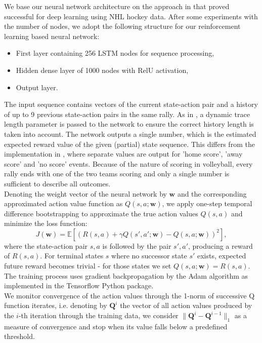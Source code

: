\documentclass{sfuthesis}
\begin{document}
	We base our neural network architecture on the approach in \cite{liu2018deep} that proved successful for deep learning using NHL hockey data. After some experiments with the number of nodes, we adopt the following structure for our reinforcement learning based neural network:
	\begin{itemize}
		\item First layer containing 256 LSTM nodes for sequence processing,
		\item Hidden dense layer of 1000 nodes with RelU activation,
		\item Output layer.
	\end{itemize}
	The input sequence contains vectors of the current state-action pair and a history of up to 9 previous state-action pairs in the same rally. As in \cite{liu2018deep}, a dynamic trace length parameter is passed to the network to ensure the correct history length is taken into account. The network outputs a single number, which is the estimated expected reward value of the given (partial) state sequence. This differs from the implementation in \cite{liu2018deep}, where separate values are output for 'home score', 'away score' and 'no score' events. Because of the nature of scoring in volleyball, every rally ends with one of the two teams scoring and only a single number is sufficient to describe all outcomes.\\
	Denoting the weight vector of the neural network by $\mathbf{w}$ and the corresponding approximated action value function as $Q(s,a;\mathbf{w})$, we apply one-step temporal difference bootstrapping \cite{sutton2018reinforcement} to approximate the true action values $Q(s,a)$ and minimize the loss function:
	$$J(\mathbf{w}) = \mathbb{E}[(R(s,a) + \gamma Q(s', a'; \mathbf{w}) - Q(s,a;\mathbf{w}))^2],$$
	where the state-action pair $s,a$ is followed by the pair $s',a'$, producing a reward of $R(s,a)$. For terminal states $s$ where no successor state $s'$ exists, expected future reward becomes trivial - for those states we set $Q(s,a;\mathbf{w}) = R(s,a)$.\\ The training process uses gradient backpropagation by the Adam algorithm \cite{kingma2014adam} as implemented in the Tensorflow Python package.\\
	We monitor convergence of the action values through the 1-norm of successive Q function iterates, i.e. denoting by $\mathbf{Q}^i$ the vector of all action values produced by the $i$-th iteration through the training data, we consider  $\|\mathbf{Q}^i - \mathbf{Q}^{i-1}\|_1$ as a measure of convergence and stop when its value falls below a predefined threshold.
	
\end{document}
